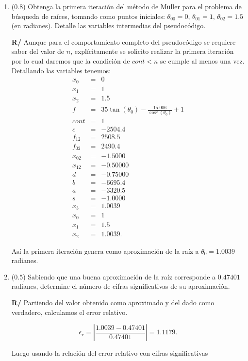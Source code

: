\documentclass[12pt]{article}
\begin{document}
\begin{enumerate}[leftmargin=*,widest=9]
\begin{enumerate}[label=\alph*]
\item (\(0.8\)) Obtenga la primera iteración del método de Müller para el problema de búsqueda de raíces, tomando como puntos iniciales: \(\theta_{00}=0,\, \theta_{01}=1,\, \theta_{02}=1.5\) (en radianes). Detalle las variables intermedias del pseudocódigo.

\textbf{R/} Aunque para el comportamiento completo del pseudocódigo se requiere saber del valor de \(n\), explícitamente se solicito realizar la primera iteración por lo cual daremos que la condición de \(cont<n\) se cumple al menos una vez. Detallando las variables tenemos:
\begin{eqnarray*}
x_0 &=& 0\\
x_1 &=& 1\\
x_2 &=& 1.5\\
f &=& 35\tan(\theta_{0}) - \frac{15.006}{\cos^{2}(\theta_{0})} + 1\\
cont &=& 1\\
c &=& -2504.4\\
f_{12} &=& 2508.5\\
f_{02} &=& 2490.4\\
x_{02} &=& -1.5000\\
x_{12} &=& -0.50000\\
d &=& -0.75000\\
b &=& -6695.4\\
a &=& -3320.5\\
s &=& -1.0000\\
x_3 &=& 1.0039\\
x_0 &=& 1\\
x_1 &=& 1.5\\
x_2 &=& 1.0039.
\end{eqnarray*}

Así la primera iteración genera como aproximación de la raíz a \(\theta_0 = 1.0039\) radianes.

\item (\(0.5\)) Sabiendo que una buena aproximación de la raíz corresponde a \(0.47401\) radianes, determine el número de cifras significativas de su aproximación.

\textbf{R/} Partiendo del valor obtenido como aproximado y del dado como verdadero, calculamos el error relativo.

\[\epsilon_r = \left|\frac{1.0039-0.47401}{0.47401}\right| = 1.1179.\]

Luego usando la relación del error relativo con cifras significativas


\end{enumerate}
\end{enumerate}
\end{document}
